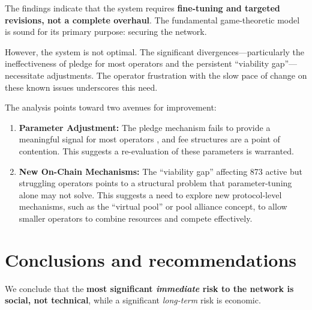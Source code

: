 \documentclass[11pt, letterpaper]{article}
\begin{document}
The findings indicate that the system requires \textbf{fine-tuning and targeted revisions,
	not a complete overhaul}. The fundamental game-theoretic model is sound for its primary purpose:
securing the network.

However, the system is not optimal. The significant divergences—particularly the ineffectiveness
of pledge for most operators and the persistent ``viability gap''—necessitate adjustments. The operator
frustration with the slow pace of change on these known issues underscores this need.

The analysis points toward two avenues for improvement:
\begin{enumerate}
	\item \textbf{Parameter Adjustment:} The pledge mechanism fails to provide a meaningful signal
	      for most operators , and fee structures are a point of contention. This suggests a re-evaluation
	      of these parameters is warranted.
	\item \textbf{New On-Chain Mechanisms:} The ``viability gap'' affecting 873 active but struggling
	      operators points to a structural problem that parameter-tuning alone may not solve. This suggests
	      a need to explore new protocol-level mechanisms, such as the ``virtual pool'' or pool alliance concept,
	      to allow smaller operators to combine resources and compete effectively.
\end{enumerate}

\section{Conclusions and recommendations}

We conclude that the \textbf{most significant \textit{immediate} risk to the network is social,
	not technical}, while a significant \textit{long-term} risk is economic.
\end{document}
